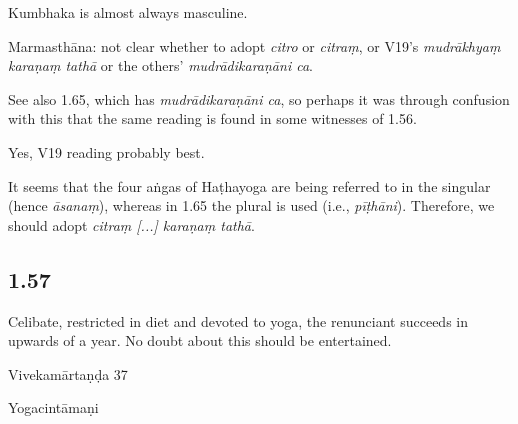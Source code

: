 \begin{ekdosis}
\begin{philcomm}[hp01_056]
Kumbhaka is almost always masculine.

Marmasthāna: not clear whether to adopt \emph{citro} or \emph{citraṃ}, or V19’s \emph{mudrākhyaṃ karaṇaṃ tathā} or the others’ \emph{mudrādikaraṇāni ca}.

See also 1.65, which has \emph{mudrādikaraṇāni ca}, so perhaps it was through confusion with this that the same reading is found in some witnesses of 1.56.

Yes, V19 reading probably best.

\begin{versinnote}
\end{versinnote}

It seems that the four aṅgas of Haṭhayoga are being referred to in the singular (hence \emph{āsanaṃ}), whereas in 1.65 the plural is used (i.e., \emph{pīṭhāni}). Therefore, we should adopt \emph{citraṃ [...] karaṇaṃ tathā}.
\end{philcomm}

\subsection*{1.57}
\begin{translation}[hp01_057]
Celibate, restricted in diet and devoted to yoga, the renunciant succeeds in upwards of a year. No doubt about this should be entertained.
\end{translation}

\begin{sources}[hp01_057]
Vivekamārtaṇḍa 37

\begin{versinnote}
\end{versinnote}

\end{sources}

\begin{testimonia}[hp01_057]
Yogacintāmaṇi

\begin{versinnote}
\end{versinnote}


\end{testimonia}
\end{ekdosis}
